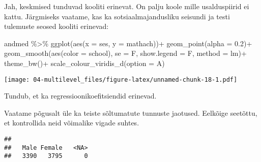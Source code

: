 \documentclass[
]{book}
\newenvironment{Shaded}{\begin{snugshade}}{\end{snugshade}}
\newcommand{\AttributeTok}[1]{\textcolor[rgb]{0.77,0.63,0.00}{#1}}
\newcommand{\FloatTok}[1]{\textcolor[rgb]{0.00,0.00,0.81}{#1}}
\newcommand{\FunctionTok}[1]{\textcolor[rgb]{0.00,0.00,0.00}{#1}}
\newcommand{\NormalTok}[1]{#1}
\newcommand{\SpecialCharTok}[1]{\textcolor[rgb]{0.00,0.00,0.00}{#1}}
\newcommand{\StringTok}[1]{\textcolor[rgb]{0.31,0.60,0.02}{#1}}
\begin{document}
Jah, keskmised tunduvad kooliti erinevat. On palju koole mille usalduspiirid ei kattu. Järgmiseks vaatame, kas ka sotsiaalmajandusliku seisundi ja testi tulemuste seosed kooliti erinevad:

\begin{Shaded}
\begin{Highlighting}[]
\NormalTok{andmed }\SpecialCharTok{\%\textgreater{}\%} 
  \FunctionTok{ggplot}\NormalTok{(}\FunctionTok{aes}\NormalTok{(}\AttributeTok{x =}\NormalTok{ ses, }\AttributeTok{y =}\NormalTok{ mathach))}\SpecialCharTok{+}
  \FunctionTok{geom\_point}\NormalTok{(}\AttributeTok{alpha =} \FloatTok{0.2}\NormalTok{)}\SpecialCharTok{+}
  \FunctionTok{geom\_smooth}\NormalTok{(}\FunctionTok{aes}\NormalTok{(}\AttributeTok{color =}\NormalTok{ school), }\AttributeTok{se =}\NormalTok{ F, }\AttributeTok{show.legend =}\NormalTok{ F, }\AttributeTok{method =} \StringTok{\textquotesingle{}lm\textquotesingle{}}\NormalTok{)}\SpecialCharTok{+}
  \FunctionTok{theme\_bw}\NormalTok{()}\SpecialCharTok{+}
  \FunctionTok{scale\_colour\_viridis\_d}\NormalTok{(}\AttributeTok{option =} \StringTok{\textquotesingle{}A\textquotesingle{}}\NormalTok{)}
\end{Highlighting}
\end{Shaded}

\texttt{[image: 04-multilevel\_files/figure-latex/unnamed-chunk-18-1.pdf]}

Tundub, et ka regressioonikoefitsiendid erinevad.

Vaatame põgusalt üle ka teiste sõltumatute tunnuste jaotused. Eelkõige seetõttu, et kontrollida neid võimalike vigade suhtes.

\begin{Shaded}
\end{Shaded}

\begin{verbatim}
## 
##   Male Female   <NA> 
##   3390   3795      0
\end{verbatim}

\begin{Shaded}
\end{Shaded}
\end{document}
